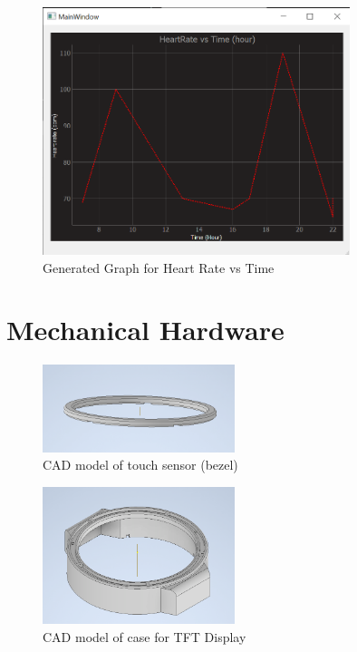 \documentclass[12pt, titlepage]{article}
\begin{document}
\begin{figure}[H]
	\begin{center}
		 \includegraphics[width=0.8\textwidth]{Graph}
		\caption{Generated Graph for Heart Rate vs Time}
		\label{Graph} 
	\end{center}
\end{figure}
\section{Mechanical Hardware}
\label{MechHardware}
\begin{figure}[H]
	\begin{center}
		 \includegraphics[width=0.5\textwidth]{BezelCAD}
		\caption{CAD model of touch sensor (bezel)}
		\label{BezelCAD} 
	\end{center}
\end{figure}

\begin{figure}[H]
	\begin{center}
		 \includegraphics[width=0.5\textwidth]{DisplayCaseCAD}
		\caption{CAD model of case for TFT Display}
		\label{DisplayCaseCAD} 
	\end{center}
\end{figure}
\end{document}
